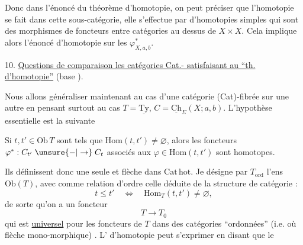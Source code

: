 Donc dans l'énoncé du théorème d'homotopie, on peut préciser que l'homotopie se fait dans cette sous-catégorie, elle s'effectue par   d'homotopies simples qui sont des morphismes de foncteurs entre catégories au dessus de $X\times X$. Cela implique alors l'énoncé d'homotopie sur les $\varphi_{X,a,b}^*$.


10. \uline{Questions de comparaison  les catégories Cat.-  satisfaisant au ``th. d'homotopie''} (base ).

Nous allons généraliser maintenant au cas d'une catégorie (Cat)-fibrée sur une autre
\margin{\unsure{(}}
en pensant surtout au cas $T=\underline{\mathrm{Ty}}$, $C=\underline{\mathrm{Ch}}_\Sigma(X;a,b)$. L'hypothèse essentielle est la suivante

Si $t,t'\in\mathrm{Ob}\,T$ sont tels que $\mathrm{Hom}(t,t')\ne\varnothing$, alors les foncteurs $\varphi^*:C_{t'}\mathrel{\unsure{-|\to}}C_t$ associés aux $\varphi\in\mathrm{Hom}(t,t')$ sont homotopes.

 Ils définissent donc une seule et  flèche dans $\mathrm{Cat\,hot}$.  Je désigne par $T_{\mathrm{ord}}$  l'ens $\mathrm{Ob}(T)$, avec comme relation d'ordre celle déduite de la structure de catégorie :
\[
t\leq t'\quad\Longleftrightarrow\quad\mathrm{Hom}_T(t,t')\ne\varnothing,
\]
 de sorte qu'on a un foncteur
\[
T\longrightarrow T_0
\]
qui est \uline{universel} pour les foncteurs de $T$ dans des catégories ``ordonnées'' (i.e. où  flèche  mono-morphique) . L' d'homotopie peut s'exprimer en disant que le  

